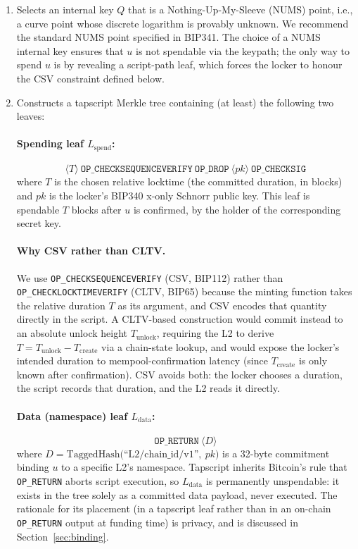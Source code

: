\documentclass[11pt,a4paper]{article}
\begin{document}
\begin{enumerate}[leftmargin=*]
  \item Selects an internal key $Q$ that is a Nothing-Up-My-Sleeve (NUMS) point, i.e., a curve point whose discrete logarithm is provably unknown. We recommend the standard NUMS point specified in BIP341. The choice of a NUMS internal key ensures that $u$ is not spendable via the keypath; the only way to spend $u$ is by revealing a script-path leaf, which forces the locker to honour the CSV constraint defined below.

  \item Constructs a tapscript Merkle tree containing (at least) the following two leaves:

  \paragraph{Spending leaf $L_{\mathrm{spend}}$:}
  \[
  \langle T\rangle\ \texttt{OP\_CHECKSEQUENCEVERIFY}\ \texttt{OP\_DROP}\ \langle pk\rangle\ \texttt{OP\_CHECKSIG}
  \]
  where $T$ is the chosen relative locktime (the committed duration, in blocks) and $pk$ is the locker's BIP340 x-only Schnorr public key. This leaf is spendable $T$ blocks after $u$ is confirmed, by the holder of the corresponding secret key.

  \paragraph{Why CSV rather than CLTV.} We use \texttt{OP\_CHECKSEQUENCEVERIFY} (CSV, BIP112) rather than \texttt{OP\_CHECKLOCKTIMEVERIFY} (CLTV, BIP65) because the minting function takes the relative duration $T$ as its argument, and CSV encodes that quantity directly in the script. A CLTV-based construction would commit instead to an absolute unlock height $T_{\mathrm{unlock}}$, requiring the L2 to derive $T = T_{\mathrm{unlock}} - T_{\mathrm{create}}$ via a chain-state lookup, and would expose the locker's intended duration to mempool-confirmation latency (since $T_{\mathrm{create}}$ is only known after confirmation). CSV avoids both: the locker chooses a duration, the script records that duration, and the L2 reads it directly.

  \paragraph{Data (namespace) leaf $L_{\mathrm{data}}$:}
  \[
  \texttt{OP\_RETURN}\ \langle D\rangle
  \]
  where $D = \mathrm{TaggedHash}\big(\text{``L2/chain\_id/v1''},\ pk\big)$ is a 32-byte commitment binding $u$ to a specific L2's namespace. Tapscript inherits Bitcoin's rule that \texttt{OP\_RETURN} aborts script execution, so $L_{\mathrm{data}}$ is permanently unspendable: it exists in the tree solely as a committed data payload, never executed. The rationale for its placement (in a tapscript leaf rather than in an on-chain \texttt{OP\_RETURN} output at funding time) is privacy, and is discussed in Section~\ref{sec:binding}.


\end{enumerate}
\end{document}
